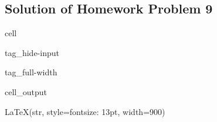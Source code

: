 \documentclass[letterpaper,10pt,english]{jupyterBook}
\begin{document}
\subsection{Solution of Homework Problem 9}
\label{\detokenize{content/tutorials/T8/tutorial_08:solution-of-homework-problem-9}}
\begin{sphinxuseclass}{cell}
\begin{sphinxuseclass}{tag_hide-input}
\begin{sphinxuseclass}{tag_full-width}\begin{sphinxVerbatimOutput}

\begin{sphinxuseclass}{cell_output}
\begin{sphinxVerbatim}[commandchars=\\\{\}]
LaTeX(str, style=\PYGZob{}\PYGZsq{}font\PYGZhy{}size\PYGZsq{}: \PYGZsq{}13pt\PYGZsq{}\PYGZcb{}, width=900)
\end{sphinxVerbatim}

\end{sphinxuseclass}\end{sphinxVerbatimOutput}

\end{sphinxuseclass}
\end{sphinxuseclass}
\end{sphinxuseclass}
\end{document}
